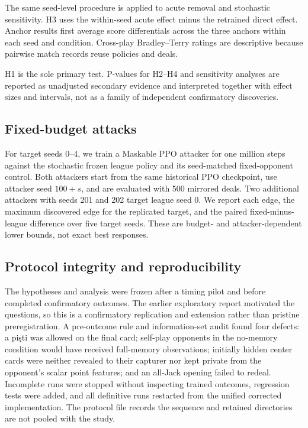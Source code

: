 \documentclass[10pt]{article}
\begin{document}
The same seed-level procedure is applied to acute removal and stochastic sensitivity. H3 uses the within-seed acute effect minus the retrained direct effect. Anchor results first average score differentials across the three anchors within each seed and condition. Cross-play Bradley--Terry ratings \cite{bradley1952rank} are descriptive because pairwise match records reuse policies and deals.

H1 is the sole primary test. P-values for H2--H4 and sensitivity analyses are reported as unadjusted secondary evidence and interpreted together with effect sizes and intervals, not as a family of independent confirmatory discoveries.

\subsection{Fixed-budget attacks}

For target seeds 0--4, we train a Maskable PPO attacker for one million steps against the stochastic frozen league policy and its seed-matched fixed-opponent control. Both attackers start from the same historical PPO checkpoint, use attacker seed $100+s$, and are evaluated with 500 mirrored deals. Two additional attackers with seeds 201 and 202 target league seed 0. We report each edge, the maximum discovered edge for the replicated target, and the paired fixed-minus-league difference over five target seeds. These are budget- and attacker-dependent lower bounds, not exact best responses.

\subsection{Protocol integrity and reproducibility}

The hypotheses and analysis were frozen after a timing pilot and before completed confirmatory outcomes. The earlier exploratory report motivated the questions, so this is a confirmatory replication and extension rather than pristine preregistration. A pre-outcome rule and information-set audit found four defects: a pişti was allowed on the final card; self-play opponents in the no-memory condition would have received full-memory observations; initially hidden center cards were neither revealed to their capturer nor kept private from the opponent's scalar point features; and an all-Jack opening failed to redeal. Incomplete runs were stopped without inspecting trained outcomes, regression tests were added, and all definitive runs restarted from the unified corrected implementation. The protocol file records the sequence and retained directories are not pooled with the study.
\end{document}
